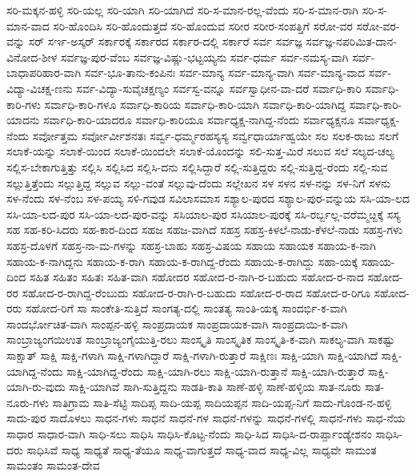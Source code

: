 {ಸರಿ-ಮಕ್ಕನ-ಹಳ್ಳಿ
ಸರಿ-ಯಲ್ಲ
ಸರಿ-ಯಾಗಿ
ಸರಿ-ಯಾಗಿದೆ
ಸರಿ-ಸ-ಮಾನ-ರಲ್ಲ-ವೆಂದು
ಸರಿ-ಸ-ಮಾನ-ರಾಗಿ
ಸರಿ-ಸ-ಮಾನ-ವಾದ
ಸರಿ-ಹೊಂದಿಸಿ
ಸರಿ-ಹೊಂದುತ್ತದೆ
ಸರಿ-ಹೊಂದುವ
ಸರೀರ
ಸರೀರ-ಸಂಪತ್ತಿಗೆ
ಸರೋ-ವರ
ಸರೋ-ವರ-ವನ್ನು
ಸರ್
ಸರ್ಇ-ಅಸ್ಕರ್
ಸರ್ಕಾರಕ್ಕೆ
ಸರ್ಕಾರದ
ಸರ್ಕಾರ-ದಲ್ಲಿ
ಸರ್ಕಾರೆ
ಸರ್ವ
ಸರ್ವಜ್ಞ
ಸರ್ವಜ್ಞ-ನಪರಿಮಿತ-ದಾನ-ವಿನೋದ-ಶೀಳ
ಸರ್ವಜ್ಞ-ಪುರ-ವೆಂಬ
ಸರ್ವಜ್ಞ-ವಿಷ್ಣು-ಭಟ್ಟಯ್ಯನು
ಸರ್ವ-ಧರ್ಮ
ಸರ್ವ-ನಮಸ್ಯ-ವಾಗಿ
ಸರ್ವ-ಬಾಧಾಪರಿಹಾರ-ವಾಗಿ
ಸರ್ವ-ಭೂ-ತಾನು-ಕಂಪಿನಃ
ಸರ್ವ-ಮಾನ್ಯ
ಸರ್ವ-ಮಾನ್ಯ-ವಾಗಿ
ಸರ್ವ-ಮಾನ್ಯ-ವಾದ
ಸರ್ವ-ವಿದ್ಯಾ-ವಿಚಕ್ಷ-ಣನು
ಸರ್ವ-ವಿದ್ಯಾ-ಸುವೈಚಕ್ಷಣ್ಯಂ
ಸರ್ವಸ್ವ-ವನ್ನೂ
ಸರ್ವಸ್ವಾಧೀನ-ವಾ-ದರೆ
ಸರ್ವಾಧಿ-ಕಾರಿ
ಸರ್ವಾಧಿ-ಕಾರಿ-ಗಳು
ಸರ್ವಾಧಿ-ಕಾರಿ-ಗಳೂ
ಸರ್ವಾಧಿ-ಕಾರಿಯ
ಸರ್ವಾಧಿ-ಕಾರಿ-ಯಾಗಿ
ಸರ್ವಾಧಿ-ಕಾರಿ-ಯಾಗಿದ್ದ
ಸರ್ವಾಧಿ-ಕಾರಿ-ಯಾದನು
ಸರ್ವಾಧಿ-ಕಾರಿ-ಯಾದರೂ
ಸರ್ವಾಧಿ-ಕಾರಿಯೂ
ಸರ್ವಾಧ್ಯಕ್ಷ-ನಾಗಿದ್ದ-ನೆಂದು
ಸರ್ವಾಧ್ಯಕ್ಷನೂ
ಸರ್ವಾಧ್ಯಕ್ಷ-ನೆಂದು
ಸರ್ವೋತ್ತಮ
ಸರ್ವೋರ್ವೀಶನತಃ
ಸರ್ವ್ವ-ಧರ್ಮ್ಮರಹಸ್ಯಸ್ಯ
ಸರ್ವ್ವಧಾರ್ಯಾಹ್ವಯೇ
ಸಲ
ಸಲಕ-ರಾಜು
ಸಲಗೆ
ಸಲಾಕೆ-ಯನ್ನು
ಸಲಾಕೆ-ಯಿಂದ
ಸಲಾಕೆ-ಯಿಂದಲೇ
ಸಲಾಕೆ-ಯೊಂದನ್ನು
ಸಲಿ-ಸುತ್ತ-ಮಿರೆ
ಸಲುವ
ಸಲೆ
ಸಲ್ಯದ-ಚಲ್ಯ
ಸಲ್ಲಿಸ-ಬೇಕಾಗುತ್ತಿತ್ತು
ಸಲ್ಲಿಸಿ
ಸಲ್ಲಿಸಿದ
ಸಲ್ಲಿಸಿ-ದನು
ಸಲ್ಲಿಸಿದ್ದಾರೆ
ಸಲ್ಲಿ-ಸುತ್ತಿದ್ದರು
ಸಲ್ಲಿ-ಸುತ್ತಿದ್ದ-ರೆಂದು
ಸಲ್ಲಿ-ಸುವ
ಸಲ್ಲುತ್ತಿತ್ತೆಂದು
ಸಲ್ಲುತ್ತಿದ್ದ
ಸಲ್ಲುವ
ಸಲ್ಲು-ವಂತೆ
ಸಲ್ಲುವು-ದೆಂದು
ಸಲ್ಲೇಖನ
ಸಳ
ಸಳನ
ಸಳ-ನನ್ನು
ಸಳ-ನಿಗೆ
ಸಳನು
ಸಳ-ನೆಂದು
ಸಳ-ನೆಂಬ
ಸಳ-ಪಯ್ಯ
ಸಳಿ-ಗವುಡ
ಸವಿಲಾಸಮಾಸ
ಸಶ್ಯಾಲ-ಪುರದ
ಸಶ್ಯಾಲ-ಪುರ-ವನ್ನುಯ
ಸಸಿ-ಯಾ-ಲದ
ಸಸಿ-ಯಾ-ಲದ-ಪುರ
ಸಸಿ-ಯಾ-ಲದ-ಪುರ-ವನ್ನು
ಸಸಿಯಾಲ-ಪುರ
ಸಸಿಯಾಲ-ಪುರಕ್ಕೆ
ಸಸಿ-ರರ್ಬ್ಬಲ್ಲ-ವರೆಮ್ಮೞ್ದಕ್ಕೆ
ಸಸ್ಯ
ಸಹ
ಸಹ-ಕರಿ-ಸಿದರು
ಸಹ-ಕಾರ-ದಿಂದ
ಸಹಜ
ಸಹಜ-ವಾಗಿದೆ
ಸಹಸ್ರ
ಸಹಸ್ರ-ಕಿಳಲೆ-ನಾಡು-ಕೆಳಲೆ-ನಾಡು
ಸಹಸ್ರ-ಗಳು
ಸಹಸ್ರ-ದೊಳಗೆ
ಸಹಸ್ರ-ನಾ-ಮ-ಗಳನ್ನು
ಸಹಸ್ರ-ಬಾಹು
ಸಹಸ್ರ-ವಿಷಯ
ಸಹಾಯ
ಸಹಾಯಕ
ಸಹಾಯ-ಕ-ನಾಗಿ
ಸಹಾಯ-ಕ-ನಾಗಿದ್ದನು
ಸಹಾಯ-ಕ-ರಾಗಿ
ಸಹಾಯ-ಕ-ರಾಗಿದ್ದ-ರೆಂದು
ಸಹಾಯ-ಕ-ರಾಗಿದ್ದು
ಸಹಾ-ಯಕ್ಕೆ
ಸಹಾಯ-ದಿಂದ
ಸಹಿತ
ಸಹಿತಂ
ಸಹಿತಃ
ಸಹಿತ-ವಾಗಿ
ಸಹೋದರ
ಸಹೋದ-ರ-ನಾಗಿ-ರ-ಬಹುದು
ಸಹೋದ-ರ-ನಾದ
ಸಹೋದ-ರರ
ಸಹೋದ-ರ-ರಾಗಿದ್ದ-ರೆಂಬುದು
ಸಹೋದ-ರ-ರಾಗಿ-ರ-ಬಹುದು
ಸಹೋದ-ರ-ರಾದ
ಸಹೋದ-ರ-ರಿಗೂ
ಸಹೋದ-ರರು
ಸಹೋದ-ರಿಗೆ
ಸಾ
ಸಾಂಕೇತಿ-ಸುತ್ತಿದೆ
ಸಾಂಗತ್ಯ-ದಲ್ಲಿ
ಸಾಂತತ್ಯ
ಸಾಂತಿ-ಯಕ್ಕ
ಸಾಂದರ್ಭಿ-ಕ-ವಾಗಿ
ಸಾಂದರ್ಭೋಚಿತ-ವಾಗಿ
ಸಾಂಪ್ಪನ-ಹಳ್ಳಿ
ಸಾಂಪ್ರದಾಯಕ
ಸಾಂಪ್ರದಾಯಕ-ವಾಗಿ
ಸಾಂಪ್ರದಾಯಿ-ಕ-ವಾಗಿ
ಸಾಂಬ್ರಾಜ್ಯಂಗಯಿಉತ
ಸಾಂಬ್ರಾಜ್ಯಂಗೈಯುತ್ತಿ-ರಲು
ಸಾಂಸ್ಕೃತಿ
ಸಾಂಸ್ಕೃತಿಕ
ಸಾಂಸ್ಕೃತಿ-ಕ-ವಾಗಿ
ಸಾಕಲ್ಯ-ವಾಗಿ
ಸಾಕಷ್ಟು
ಸಾಕ್ಷಾತ್
ಸಾಕ್ಷಿ
ಸಾಕ್ಷಿ-ಗಳಾಗಿ
ಸಾಕ್ಷಿ-ಗಳಾಗಿದ್ದಾರೆ
ಸಾಕ್ಷಿ-ಗಳಾಗಿ-ರುತ್ತಾರೆ
ಸಾಕ್ಷಿಣಃ
ಸಾಕ್ಷಿ-ಯಾಗಿ
ಸಾಕ್ಷಿ-ಯಾಗಿದೆ
ಸಾಕ್ಷಿ-ಯಾಗಿದ್ದ-ನೆಂದು
ಸಾಕ್ಷಿ-ಯಾಗಿದ್ದ-ರೆಂದು
ಸಾಕ್ಷಿ-ಯಾಗಿ-ರಲು
ಸಾಕ್ಷಿ-ಯಾಗಿ-ರುತ್ತಾನೆ
ಸಾಕ್ಷಿ-ಯಾಗಿ-ರುತ್ತಾರೆ
ಸಾಕ್ಷಿ-ಯಾಗಿ-ರು-ವುದು
ಸಾಕ್ಷಿ-ಯಾಗಿವೆ
ಸಾಗಿ-ಸುತ್ತಿದ್ದನು
ಸಾಡತಿ-ಕಾತಿ
ಸಾಣೆ-ಹಳ್ಳಿ
ಸಾಣೆ-ಹಳ್ಳಿಯ
ಸಾತ-ನೂರು
ಸಾತ-ನೂರು-ಗಳು
ಸಾತಿಗ್ರಾಮ
ಸಾತಿ-ಸೆಟ್ಟಿ
ಸಾದಿಪ್ಪ
ಸಾದಿ-ಯಪ್ಪ
ಸಾದಿಯಪ್ಪನ
ಸಾದಿ-ಯಪ್ಪ-ನಿಗೆ
ಸಾದು-ಗೊಂಡ-ನ-ಹಳ್ಳಿ
ಸಾದು-ಪುರ
ಸಾದೊಳಲು
ಸಾಧನ-ಗಳು
ಸಾಧನೆ
ಸಾಧನೆ-ಗಳ
ಸಾಧನೆ-ಗಳನ್ನು
ಸಾಧನೆ-ಗಳಲ್ಲಿ
ಸಾಧನೆ-ಗಳು
ಸಾಧ-ನೆಯ
ಸಾಧಾರ
ಸಾಧಾರ-ವಾಗಿ
ಸಾಧಿ-ಸಲು
ಸಾಧಿಸಿ
ಸಾಧಿಸಿ-ಕೊಟ್ಟ-ನೆಂದು
ಸಾಧಿ-ಸಿದ
ಸಾಧಿಸಿ-ದ-ರಾರ್ಪ್ಪಾಂಡ್ಯೇಶನಂ
ಸಾಧಿಸಿ-ದರು
ಸಾಧಿಸಿವೆ
ಸಾಧ್ಯ
ಸಾಧ್ಯತೆ
ಸಾಧ್ಯ-ತೆಯೂ
ಸಾಧ್ಯ-ವಾಗುತ್ತದೆ
ಸಾಧ್ಯ-ವಾದ
ಸಾಧ್ಯ-ವಿಲ್ಲ
ಸಾಧ್ಯವೇ
ಸಾಮಂತ
ಸಾಮಂತಂ
ಸಾಮಂತ-ದೇವ
}
